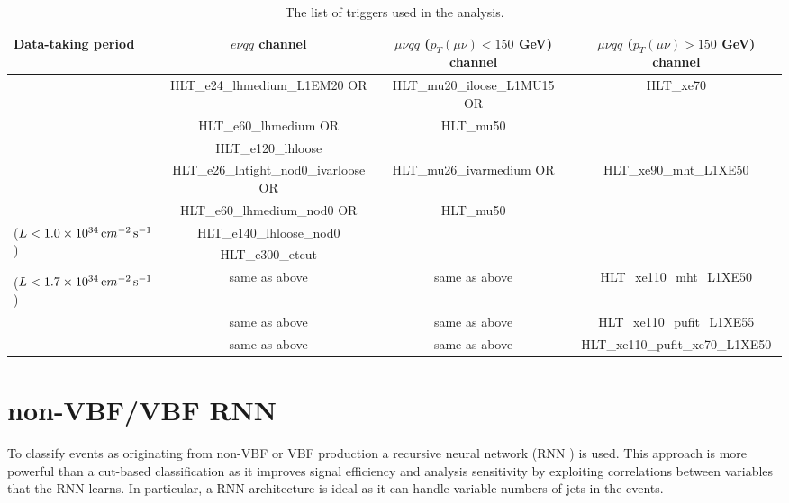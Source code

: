 \begin{landscape}
\begin{table}[p]
  \caption{The list of triggers used in the analysis.} \label{tbl:triggers}
\begin{center} 
\small
\begin{tabular}{|l|c|c|c|}
\hline
Data-taking period & $e\nu qq$ channel & $\mu\nu qq$ ($p_{T}(\mu\nu)<150$ GeV) channel & $\mu\nu qq$ ($p_{T}(\mu\nu) > 150$ GeV) channel  \\
\hline
\hline
\multirow{3}{*}{\centering {2015}} & HLT\_e24\_lhmedium\_L1EM20 OR & HLT\_mu20\_iloose\_L1MU15 OR & \multirow{3}{*}{ HLT\_xe70 } \\
 & HLT\_e60\_lhmedium OR & HLT\_mu50 & \\
 & HLT\_e120\_lhloose & & \\
\hline
\multirow{2}{*}{\centering {2016a (run $< 302919$)}} & HLT\_e26\_lhtight\_nod0\_ivarloose OR & HLT\_mu26\_ivarmedium OR  & \multirow{3}{*}{ HLT\_xe90\_mht\_L1XE50 } \\
 & HLT\_e60\_lhmedium\_nod0 OR & HLT\_mu50 &  \\ 
\multirow{2}{*}{($L<1.0\times10^{34}\,{\textrm cm}^{-2}\,{\textrm s}^{-1}$)} & HLT\_e140\_lhloose\_nod0 & & \\
 & HLT\_e300\_etcut & & \\
\hline
{\centering {2016b (run $\geq 302919$)}} & \multirow{2}{*}{same as above} & \multirow{2}{*}{same as above}  &  \multirow{2}{*}{HLT\_xe110\_mht\_L1XE50} \\
($L<1.7\times10^{34}\,{\textrm cm}^{-2}\,{\textrm s}^{-1}$) & & &\\
\hline
{\centering {2017}} & same as above & same as above  &  HLT\_xe110\_pufit\_L1XE55 \\
\hline
{\centering {2018}} & same as above & same as above  &  HLT\_xe110\_pufit\_xe70\_L1XE50  \\
\hline
\end{tabular}
\end{center}
\end{table}
\end{landscape}
\section{non-VBF/VBF RNN}
\label{rnn}
To classify events as originating from non-VBF or VBF production a recursive neural network (RNN \cite{rnn}) is used. This approach is more powerful than a cut-based classification as it improves signal efficiency and analysis sensitivity by exploiting correlations between variables that the RNN learns. In particular, a RNN architecture is ideal as it can handle variable numbers of jets in the events.  

